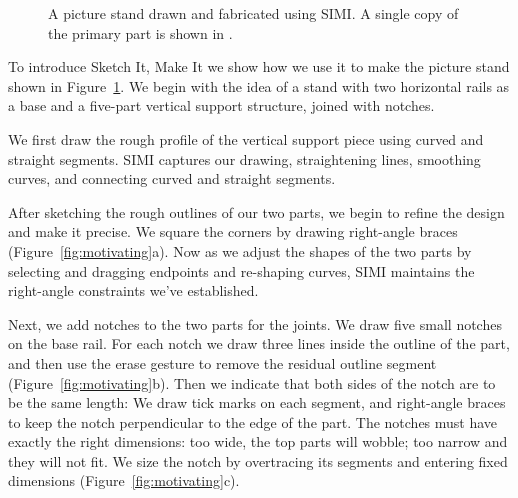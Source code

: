 \documentclass{article}
\begin{document}
\begin{figure}[t]
\centering 
{}
\caption{A picture stand  drawn and fabricated
  using SIMI. A single copy of the primary part is shown in
  . }
\label{fig:simi-example}
\end{figure}

To introduce Sketch It, Make It we show how we use it to make the
picture stand shown in Figure~\ref{fig:simi-example}. We begin with
the idea of a stand with two horizontal rails as a base and a
five-part vertical support structure, joined with notches.

We first draw the rough profile of the vertical support piece using
curved and straight segments. SIMI captures our drawing, straightening
lines, smoothing curves, and connecting curved and straight segments.
 
After sketching the rough outlines of our two parts, we begin to
refine the design and make it precise.  We square the corners by
drawing right-angle braces (Figure~\ref{fig:motivating}a).  Now as we
adjust the shapes of the two parts by selecting and dragging endpoints
and re-shaping curves, SIMI maintains the right-angle constraints
we've established.
 
Next, we add notches to the two parts for the joints.  We draw five
small notches on the base rail.  For each notch we draw three lines
inside the outline of the part, and then use the erase gesture to
remove the residual outline segment (Figure~\ref{fig:motivating}b).
Then we indicate that both sides of the notch are to be the same
length: We draw tick marks on each segment, and right-angle braces to
keep the notch perpendicular to the edge of the part.  The notches
must have exactly the right dimensions: too wide, the top parts will
wobble; too narrow and they will not fit.  We size the notch by
overtracing its segments and entering fixed dimensions
(Figure~\ref{fig:motivating}c).
 
\end{document}
